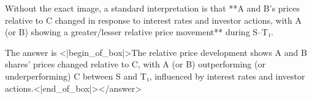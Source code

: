 Without the exact image, a standard interpretation is that **A and B’s prices relative to C changed in response to interest rates and investor actions, with A (or B) showing a greater/lesser relative price movement** during S–T₁.  

The answer is <|begin_of_box|>The relative price development shows A and B shares’ prices changed relative to C, with A (or B) outperforming (or underperforming) C between S and T₁, influenced by interest rates and investor actions.<|end_of_box|></answer>